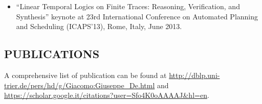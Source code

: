 \begin{itemize}
\item	 ``Linear Temporal Logics on Finite Traces: Reasoning, Verification, and Synthesis'' keynote at 23rd International Conference on Automated Planning and Scheduling (ICAPS’13), Rome, Italy, June 2013.
\end{itemize}

\subsection*{PUBLICATIONS}
A comprehensive list of publication can be found at
\url{http://dblp.uni-trier.de/pers/hd/g/Giacomo:Giuseppe_De.html} and
\url{https://scholar.google.it/citations?user=Sfo4K0oAAAAJ&hl=en}.



